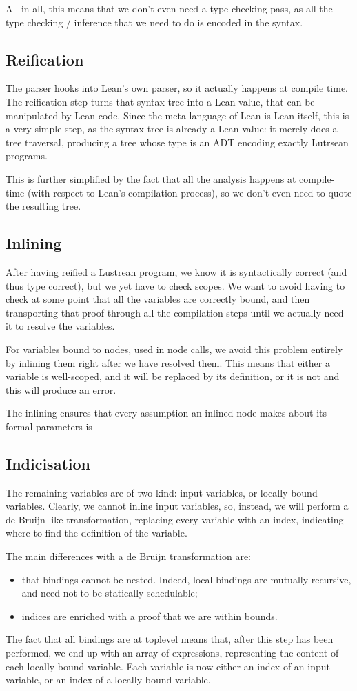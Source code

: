 \documentclass{scrartcl}
\begin{document}
All in all, this means that we don't even need a type checking pass, as all the type checking /
inference that we need to do is encoded in the syntax.

\subsection{Reification}
The parser hooks into Lean's own parser, so it actually happens at compile time.  The reification
step turns that syntax tree into a Lean value, that can be manipulated by Lean code.  Since the
meta-language of Lean is Lean itself, this is a very simple step, as the syntax tree is already a
Lean value: it merely does a tree traversal, producing a tree whose type is an ADT encoding
exactly Lutrsean programs.

This is further simplified by the fact that all the analysis happens at compile-time (with
respect to Lean's compilation process), so we don't even need to quote the resulting tree.

\subsection{Inlining}
After having reified a Lustrean program, we know it is syntactically correct (and thus type
correct), but we yet have to check scopes.  We want to avoid having to check at some point that
all the variables are correctly bound, and then transporting that proof through all the
compilation steps until we actually need it to resolve the variables.

For variables bound to nodes, used in node calls, we avoid this problem entirely by inlining them
right after we have resolved them.  This means that either a variable is well-scoped, and it will
be replaced by its definition, or it is not and this will produce an error.

The inlining ensures that every assumption an inlined node makes about its formal parameters is

\subsection{Indicisation}
The remaining variables are of two kind: input variables, or locally bound variables.  Clearly,
we cannot inline input variables, so, instead, we will perform a de Bruijn-like transformation,
replacing every variable with an index, indicating where to find the definition of the variable.

The main differences with a de Bruijn transformation are:
\begin{itemize}
\item that bindings cannot be nested.  Indeed, local bindings are mutually recursive, and need
  not to be statically schedulable;
\item indices are enriched with a proof that we are within bounds.
\end{itemize}
The fact that all bindings are at toplevel means that, after this step has been performed, we end
up with an array of expressions, representing the content of each locally bound variable.  Each
variable is now either an index of an input variable, or an index of a locally bound variable.
\end{document}
